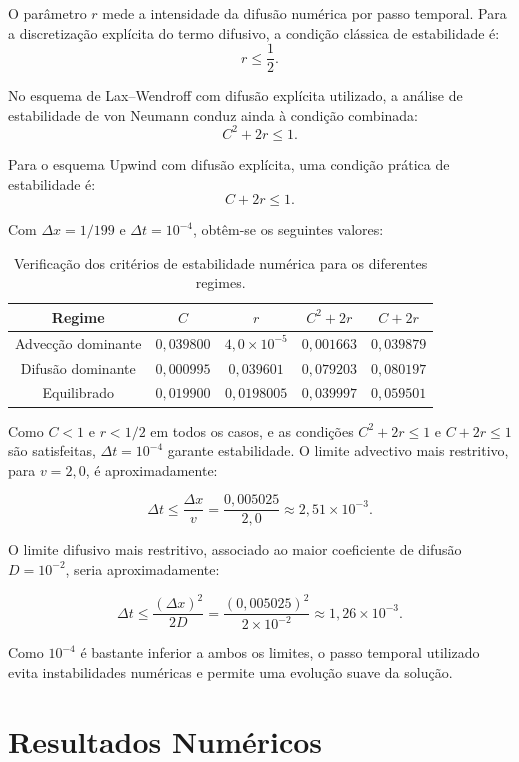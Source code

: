 \documentclass{article}
\begin{document}
O parâmetro \(r\) mede a intensidade da difusão numérica por passo temporal. Para a discretização explícita do termo difusivo, a condição clássica de estabilidade é:
\[
r \le \frac{1}{2}.
\]

No esquema de Lax--Wendroff com difusão explícita utilizado, a análise de estabilidade de von Neumann conduz ainda à condição combinada:
\[
C^2 + 2r \le 1.
\]

Para o esquema Upwind com difusão explícita, uma condição prática de estabilidade é:
\[
C + 2r \le 1.
\]

Com \(\Delta x = 1/199\) e \(\Delta t = 10^{-4}\), obtêm-se os seguintes valores:

\begin{table}[H]
\centering
\begin{tabular}{ccccc}
\hline
Regime & $C$ & $r$ & $C^2 + 2r$ & $C + 2r$ \\
\hline
Advecção dominante & $0{,}039800$ & $4{,}0 \times 10^{-5}$ & $0{,}001663$ & $0{,}039879$ \\
Difusão dominante & $0{,}000995$ & $0{,}039601$ & $0{,}079203$ & $0{,}080197$ \\
Equilibrado & $0{,}019900$ & $0{,}0198005$ & $0{,}039997$ & $0{,}059501$ \\
\hline
\end{tabular}
\caption{Verificação dos critérios de estabilidade numérica para os diferentes regimes.}
\end{table}

Como \(C<1\) e \(r<1/2\) em todos os casos, e as condições \(C^2+2r\leq1\) e \(C+2r\leq1\) são satisfeitas, \(\Delta t=10^{-4}\) garante estabilidade. O limite advectivo mais restritivo, para \(v=2{,}0\), é aproximadamente:

\[
\Delta t \le \frac{\Delta x}{v}
= \frac{0{,}005025}{2{,}0}
\approx 2{,}51 \times 10^{-3}.
\]

O limite difusivo mais restritivo, associado ao maior coeficiente de difusão \(D=10^{-2}\), seria aproximadamente:

\[
\Delta t \le \frac{(\Delta x)^2}{2D}
= \frac{(0{,}005025)^2}{2 \times 10^{-2}}
\approx 1{,}26 \times 10^{-3}.
\]

Como \(10^{-4}\) é bastante inferior a ambos os limites, o passo temporal utilizado evita instabilidades numéricas e permite uma evolução suave da solução.

\section{Resultados Numéricos}
\end{document}
